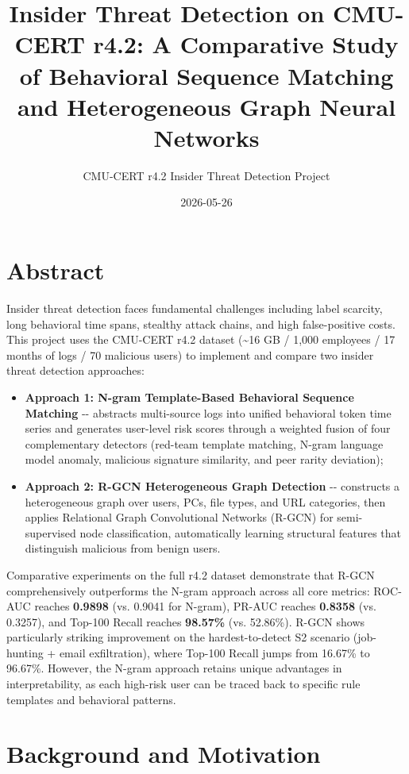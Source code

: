 \documentclass[
  a4paper,
  11pt]{article}
\title{Insider Threat Detection on CMU-CERT r4.2: A Comparative Study of
Behavioral Sequence Matching and Heterogeneous Graph Neural Networks}
\author{CMU-CERT r4.2 Insider Threat Detection Project}
\date{2026-05-26}
\providecommand{\tightlist}{%
  \setlength{\itemsep}{0pt}\setlength{\parskip}{0pt}}
\begin{document}
\maketitle

{
\setcounter{tocdepth}{3}
\tableofcontents
}
\section*{Abstract}

Insider threat detection faces fundamental challenges including label
scarcity, long behavioral time spans, stealthy attack chains, and high
false-positive costs. This project uses the CMU-CERT r4.2 dataset
(\textasciitilde16 GB / 1,000 employees / 17 months of logs / 70
malicious users) to implement and compare two insider threat detection
approaches:

\begin{itemize}
\tightlist
\item
  \textbf{Approach 1: N-gram Template-Based Behavioral Sequence
  Matching} -\/- abstracts multi-source logs into unified behavioral
  token time series and generates user-level risk scores through a
  weighted fusion of four complementary detectors (red-team template
  matching, N-gram language model anomaly, malicious signature
  similarity, and peer rarity deviation);
\item
  \textbf{Approach 2: R-GCN Heterogeneous Graph Detection} -\/-
  constructs a heterogeneous graph over users, PCs, file types, and URL
  categories, then applies Relational Graph Convolutional Networks
  (R-GCN) for semi-supervised node classification, automatically
  learning structural features that distinguish malicious from benign
  users.
\end{itemize}

Comparative experiments on the full r4.2 dataset demonstrate that R-GCN
comprehensively outperforms the N-gram approach across all core metrics:
ROC-AUC reaches \textbf{0.9898} (vs. 0.9041 for N-gram), PR-AUC reaches
\textbf{0.8358} (vs. 0.3257), and Top-100 Recall reaches
\textbf{98.57\%} (vs. 52.86\%). R-GCN shows particularly striking
improvement on the hardest-to-detect S2 scenario (job-hunting + email
exfiltration), where Top-100 Recall jumps from 16.67\% to 96.67\%.
However, the N-gram approach retains unique advantages in
interpretability, as each high-risk user can be traced back to specific
rule templates and behavioral patterns.

\section{Background and Motivation}\label{background-and-motivation}
\end{document}
